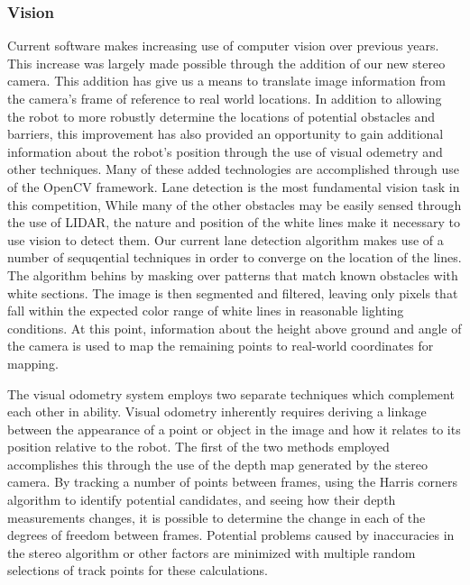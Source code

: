 \subsubsection{Vision}
Current software makes increasing use of computer vision over previous years. This increase was largely made possible through the addition of our new stereo camera. This addition has give us a means to translate image information from the camera's frame of reference to real world locations. In addition to allowing the robot to more robustly determine the locations of potential obstacles and barriers, this improvement has also provided an opportunity to gain additional information about the robot's position through the use of visual odemetry and other techniques. Many of these added technologies are accomplished through use of the OpenCV framework.
Lane detection is the most fundamental vision task in this competition, While many of the other obstacles may be easily sensed through the use of LIDAR, the nature and position of the white lines make it necessary to use vision to detect them. Our current lane detection algorithm makes use of a number of sequqential techniques in order to converge on the location of the lines. The algorithm behins by masking over patterns that match known obstacles with white sections. The image is then segmented and filtered, leaving only pixels that fall within the expected color range of white lines in reasonable lighting conditions. At this point, information about the height above ground and angle of the camera is used to map the remaining points to real-world coordinates for mapping.

The visual odometry system employs two separate techniques which complement each other in ability. Visual odometry inherently requires deriving a linkage between the appearance of a point or object in the image and how it relates to its position relative to the robot. The first of the two methods employed accomplishes this through the use of the depth map generated by the stereo camera. By tracking a number of points between frames, using the Harris corners algorithm to identify potential candidates, and seeing how their depth measurements changes, it is possible to determine the change in each of the degrees of freedom between frames. Potential problems caused by inaccuracies in the stereo algorithm or other factors are minimized with multiple random selections of track points for these calculations. 

